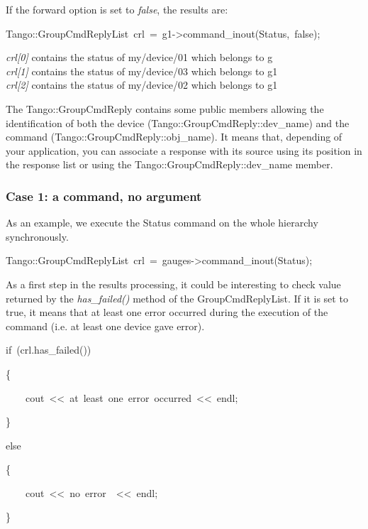 If the forward option is set to \emph{false}, the results are:
\begin{lyxcode}
Tango::GroupCmdReplyList~crl~=~g1->command\_inout(\textquotedbl{}Status\textquotedbl{},~false);~
\end{lyxcode}
\emph{crl{[}0{]}} contains the status of my/device/01 which belongs
to g \\
\emph{crl{[}1{]}} contains the status of my/device/03 which belongs
to g1\\
\emph{crl{[}2{]}} contains the status of my/device/02 which belongs
to g1

The Tango::GroupCmdReply contains some public members allowing the
identification of both the device (Tango::GroupCmdReply::dev\_name)
and the command (Tango::GroupCmdReply::obj\_name).
It means that, depending of your application, you can associate a
response with its source using its position in the response list or
using the Tango::GroupCmdReply::dev\_name member.


\subsubsection{Case 1: a command, no argument\label{sub:Case-1}}

As an example, we execute the Status command on the whole hierarchy
synchronously.
\begin{lyxcode}
Tango::GroupCmdReplyList~crl~=~gauges->command\_inout(\textquotedbl{}Status\textquotedbl{});
\end{lyxcode}
As a first step in the results processing, it could be interesting
to check value returned by the \emph{has\_failed()}
method of the GroupCmdReplyList. If it is
set to true, it means that at least one error occurred during the
execution of the command (i.e. at least one device gave error).


\begin{lyxcode}
if~(crl.has\_failed())

\{

~~~~cout~<\textcompwordmark{}<~\textquotedbl{}at~least~one~error~occurred\textquotedbl{}~<\textcompwordmark{}<~endl;

\}

else

\{

~~~~cout~<\textcompwordmark{}<~\textquotedbl{}no~error~\textquotedbl{}~<\textcompwordmark{}<~endl;

\}
\end{lyxcode}


